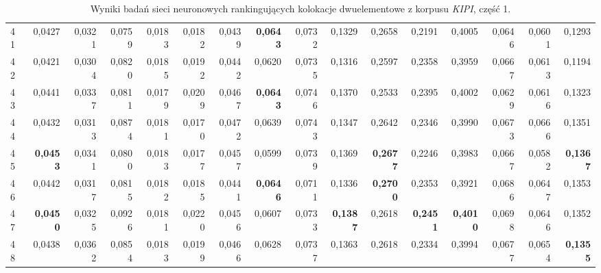\begin{table}[htp!]
\begin{adjustwidth}{-2cm}{}
\begin{tabular}{ l | *{15}{| r}}
41	&	0,0427	&	0,0321	&	0,0759	&	0,0183	&	0,0182	&	0,0439	&	\textbf{0,0643}	&	0,0732	&	0,1329	&	0,2658	&	0,2191	&	0,4005	&	0,0646	&	0,0601	&	0,1293	\\
42	&	0,0421	&	0,0304	&	0,0820	&	0,0185	&	0,0192	&	0,0442	&	0,0620	&	0,0735	&	0,1316	&	0,2597	&	0,2358	&	0,3959	&	0,0667	&	0,0613	&	0,1194	\\
43	&	0,0441	&	0,0337	&	0,0811	&	0,0179	&	0,0209	&	0,0467	&	\textbf{0,0643}	&	0,0746	&	0,1370	&	0,2533	&	0,2395	&	0,4002	&	0,0629	&	0,0616	&	0,1323	\\
44	&	0,0432	&	0,0313	&	0,0874	&	0,0181	&	0,0170	&	0,0472	&	0,0639	&	0,0743	&	0,1347	&	0,2642	&	0,2346	&	0,3990	&	0,0673	&	0,0666	&	0,1351	\\
45	&	\textbf{0,0453}	&	0,0341	&	0,0800	&	0,0183	&	0,0177	&	0,0457	&	0,0599	&	0,0739	&	0,1369	&	\textbf{0,2677}	&	0,2246	&	0,3983	&	0,0667	&	0,0582	&	\textbf{0,1367}	\\
46	&	0,0442	&	0,0317	&	0,0815	&	0,0182	&	0,0185	&	0,0441	&	\textbf{0,0646}	&	0,0711	&	0,1336	&	\textbf{0,2700}	&	0,2353	&	0,3921	&	0,0686	&	0,0647	&	0,1353	\\
47	&	\textbf{0,0450}	&	0,0325	&	0,0926	&	0,0181	&	0,0220	&	0,0456	&	0,0607	&	0,0733	&	\textbf{0,1387}	&	0,2618	&	\textbf{0,2451}	&	\textbf{0,4010}	&	0,0698	&	0,0646	&	0,1352	\\
48	&	0,0438	&	0,0362	&	0,0854	&	0,0183	&	0,0199	&	0,0466	&	0,0628	&	0,0737	&	0,1363	&	0,2618	&	0,2334	&	0,3994	&	0,0677	&	0,0654	&	\textbf{0,1355}	\\
	\bottomrule
\end{tabular}
 \end{adjustwidth}
\caption[Wyniki badań sieci neuronowych rankingujących kolokacje dwuelementowe z korpusu \emph{KIPI}, część 1]{Wyniki badań sieci neuronowych rankingujących kolokacje dwuelementowe z korpusu \emph{KIPI}, część 1.}
\label{KIPI_nn_part_1}
\end{table}

